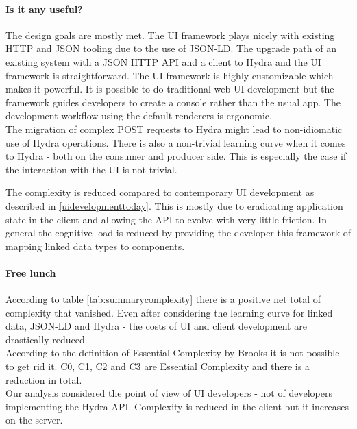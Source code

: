\paragraph{Is it any useful?}
The design goals are mostly met. The UI framework plays nicely with existing HTTP and JSON tooling due to the use of JSON-LD. The upgrade path of an existing system with a JSON HTTP API and a client to Hydra and the UI framework is straightforward. The UI framework is highly customizable which makes it powerful. It is possible to do traditional web UI development but the framework guides developers to create a console rather than the usual app. The development workflow using the default renderers is ergonomic. \\
The migration of complex POST requests to Hydra might lead to non-idiomatic use of Hydra operations. There is also a non-trivial learning curve when it comes to Hydra - both on the consumer and producer side. This is especially the case if the interaction with the UI is not trivial.

The complexity is reduced compared to contemporary UI development as described in \ref{uidevelopmenttoday}. This is mostly due to eradicating application state in the client and allowing the API to evolve with very little friction. In general the cognitive load is reduced by providing the developer this framework of mapping linked data types to components.

\paragraph{Free lunch}
According to table \ref{tab:summarycomplexity} there is a positive net total of complexity that vanished. Even after considering the learning curve for linked data, JSON-LD and Hydra - the costs of UI and client development are drastically reduced. \\
According to the definition of Essential Complexity by Brooks it is not possible to get rid it. C0, C1, C2 and C3 are Essential Complexity and there is a reduction in total. \\
Our analysis considered the point of view of UI developers - not of developers implementing the Hydra API. Complexity is reduced in the client but it increases on the server.

